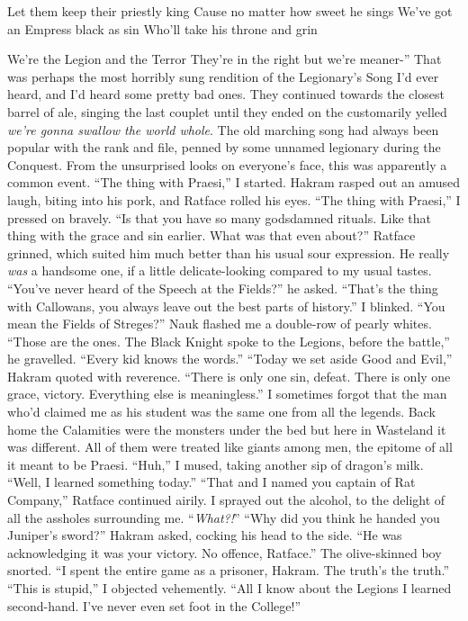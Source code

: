 \documentclass[12pt, openany]{book}
\begin{document}
Let them keep their priestly king
Cause no matter how sweet he sings
We’ve got an Empress black as sin
Who’ll take his throne and grin

We’re the Legion and the Terror
They’re in the right but we’re meaner-”
That was perhaps the most horribly sung rendition of the Legionary’s Song I’d ever heard, and I’d heard some pretty bad ones. They continued towards the closest barrel of ale, singing the last couplet until they ended on the customarily yelled \textit{we’re gonna swallow the world whole}. The old marching song had always been popular with the rank and file, penned by some unnamed legionary during the Conquest. From the unsurprised looks on everyone’s face, this was apparently a common event.
“The thing with Praesi,” I started.
Hakram rasped out an amused laugh, biting into his pork, and Ratface rolled his eyes.
“The thing with Praesi,” I pressed on bravely. “Is that you have so many godsdamned rituals. Like that thing with the grace and sin earlier. What was that even about?”
Ratface grinned, which suited him much better than his usual sour expression. He really \textit{was} a handsome one, if a little delicate-looking compared to my usual tastes.
“You’ve never heard of the Speech at the Fields?” he asked. “That’s the thing with Callowans, you always leave out the best parts of history.”
I blinked. “You mean the Fields of Streges?”
Nauk flashed me a double-row of pearly whites.
“Those are the ones. The Black Knight spoke to the Legions, before the battle,” he gravelled. “Every kid knows the words.”
“Today we set aside Good and Evil,” Hakram quoted with reverence. “There is only one sin, defeat. There is only one grace, victory. Everything else is meaningless.”
I sometimes forgot that the man who’d claimed me as his student was the same one from all the legends. Back home the Calamities were the monsters under the bed but here in Wasteland it was different. All of them were treated like giants among men, the epitome of all it meant to be Praesi.
“Huh,” I mused, taking another sip of dragon’s milk. “Well, I learned something today.”
“That and I named you captain of Rat Company,” Ratface continued airily.
I sprayed out the alcohol, to the delight of all the assholes surrounding me.
“\textit{What?!}”
“Why did you think he handed you Juniper’s sword?” Hakram asked, cocking his head to the side. “He was acknowledging it was your victory. No offence, Ratface.”
The olive-skinned boy snorted. “I spent the entire game as a prisoner, Hakram. The truth’s the truth.”
“This is stupid,” I objected vehemently. “All I know about the Legions I learned second-hand. I’ve never even set foot in the College!”
\end{document}
